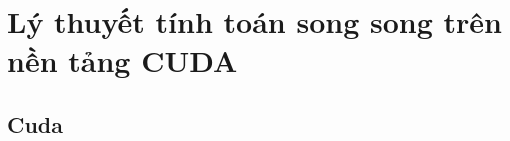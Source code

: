 \documentclass[../../main.tex]{subfiles}
\begin{document}
\graphicspath{{imgs/}{02_theory/imgs/}}

\chapter{Lý thuyết tính toán song song trên nền tảng CUDA}
\section{Cuda}
\end{document}
